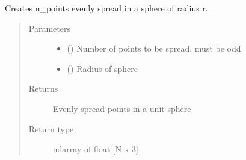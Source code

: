 \documentclass[letterpaper,10pt,english,openany,oneside]{sphinxmanual}
\begin{document}

\begin{fulllineitems}
\label{\detokenize{pygpc:pygpc.misc.sample_sphere}}
Creates n\_points evenly spread in a sphere of radius r.
\begin{quote}\begin{description}
\item[{Parameters}] \leavevmode\begin{itemize}
\item {} 
 () \textendash{} Number of points to be spread, must be odd

\item {} 
 () \textendash{} Radius of sphere

\end{itemize}

\item[{Returns}] \leavevmode
{} \textendash{} Evenly spread points in a unit sphere

\item[{Return type}] \leavevmode
ndarray of float {[}N x 3{]}

\end{description}\end{quote}

\end{fulllineitems}

\end{document}
